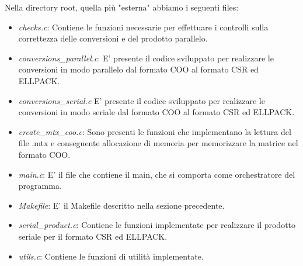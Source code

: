 \documentclass{article}
\begin{document}
Nella directory root, quella più "esterna" abbiamo i seguenti files:
\begin{itemize}
    \item \textit{checks.c}: Contiene le funzioni necessarie per effettuare i controlli sulla correttezza delle conversioni e del prodotto parallelo.
    \item \textit{conversions\_parallel.c}: E' presente il codice sviluppato per realizzare le conversioni in modo parallelo dal formato COO al formato CSR ed ELLPACK.
    \item \textit{conversions\_serial.c}
    E' presente il codice sviluppato per realizzare le conversioni in modo seriale dal formato COO al formato CSR ed ELLPACK.
    \item \textit{create\_mtx\_coo.c}: Sono presenti le funzioni che implementano la lettura del file .mtx e conseguente allocazione di memoria per memorizzare la matrice nel formato COO.
    \item \textit{main.c}: E' il file che contiene il main, che si comporta come orchestratore del programma.
    \item \textit{Makefile}: E' il Makefile descritto nella sezione precedente.
    \item \textit{serial\_product.c}: Contiene le funzioni implementate per realizzare il prodotto seriale per il formato CSR ed ELLPACK.
    \item \textit{utils.c}: Contiene le funzioni di utilità implementate. 
\end{itemize}
\end{document}
